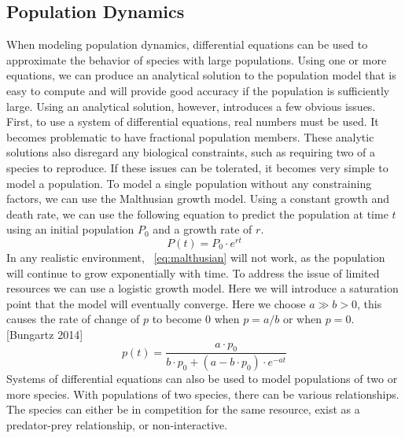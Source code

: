     \subsection{Population Dynamics}\label{subsec:population-dynamics}
        When modeling population dynamics, differential equations can be used to
        approximate the behavior of species with large populations.
        Using one or more equations, we can produce an analytical solution to the
        population model that is easy to compute and will provide good accuracy
        if the population is sufficiently large.
        Using an analytical solution, however, introduces a few obvious issues.
        First, to use a system of differential equations, real numbers must be used.
        It becomes problematic to have fractional population members.
        These analytic solutions also disregard any biological constraints,
        such as requiring two of a species to reproduce.
        If these issues can be tolerated, it becomes very simple to model a population.
        To model a single population without any constraining factors,
        we can use the Malthusian growth model.
        Using a constant growth and death rate, we can use the following equation
        to predict the population at time $t$ using an initial population $P_{0}$
        and a growth rate of $r$.
        \begin{equation}\label{eq:malthusian}
            P(t) = P_{0} \cdot e^{rt}
        \end{equation}
        In any realistic environment, ~\ref{eq:malthusian} will not work, as the population
        will continue to grow exponentially with time.
        To address the issue of limited resources we can use a logistic growth model.
        Here we will introduce a saturation point that the model will eventually converge.
        Here we choose $a \gg b > 0$, this causes the rate of change of $p$ to become $0$
        when $p = a/b$ or when $p = 0$. [Bungartz 2014]
        \begin{equation}\label{eq:logistic}
            \displaystyle p(t) =
            \frac{a \cdot p_0}{b \cdot p_0 + (a - b \cdot p_0) \cdot e^{-at}}
        \end{equation}
        Systems of differential equations can also be used to model populations of two
        or more species.
        With populations of two species, there can be various relationships.
        The species can either be in competition for the same resource,
        exist as a predator-prey relationship, or non-interactive.
